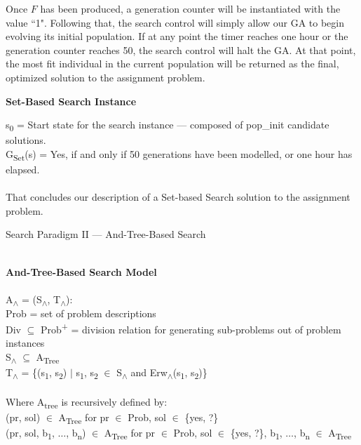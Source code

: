 \documentclass[11pt, oneside]{article}   	%
\begin{document}
\noindent Once $F$ has been produced, a generation counter will be instantiated with the value ``1". Following that, the search control will simply allow our GA to begin evolving its initial population. If at any point the timer reaches one hour or the generation counter reaches 50, the search control will halt the GA. At that point, the most fit individual in the current population will be returned as the final, optimized solution to the assignment problem.

\noindent \textbf{Set-Based Search Instance}

\noindent s\textsubscript{0} = Start state for the search instance --- composed of pop_init candidate solutions.\\
G\textsubscript{Set}(s) = Yes, if and only if 50 generations have been modelled, or one hour has elapsed.\\\\

\noindent That concludes our description of a Set-based Search solution to the assignment problem.

\newpage

\centerline{{\Large Search Paradigm II --- And-Tree-Based Search}}
\noindent \textbf{\\And-Tree-Based Search Model}\\\\
A\textsubscript{$\land$} = (S\textsubscript{$\land$}, T\textsubscript{$\land$}):\\
\indent Prob = set of problem descriptions\\
\indent Div $\subseteq$ Prob\textsuperscript{+} = division relation for generating sub-problems out of problem instances\\
\indent S\textsubscript{$\land$} $\subseteq$ A\textsubscript{Tree}\\
\indent T\textsubscript{$\land$} = \{(s\textsubscript{1}, s\textsubscript{2}) $\vert$ s\textsubscript{1}, s\textsubscript{2} $\in$ S\textsubscript{$\land$} and Erw\textsubscript{$\land$}(s\textsubscript{1}, s\textsubscript{2})\}\\\\
Where A\textsubscript{tree} is recursively defined by:\\
\indent (pr, sol) $\in$ A\textsubscript{Tree} for pr $\in$ Prob, sol $\in$ \{yes, ?\}\\
\indent (pr, sol, b\textsubscript{1}, $\ldots$, b\textsubscript{n}) $\in$ A\textsubscript{Tree} for pr $\in$ Prob, sol $\in$ \{yes, ?\}, b\textsubscript{1}, $\ldots$, b\textsubscript{n} $\in$ A\textsubscript{Tree}
\end{document}
